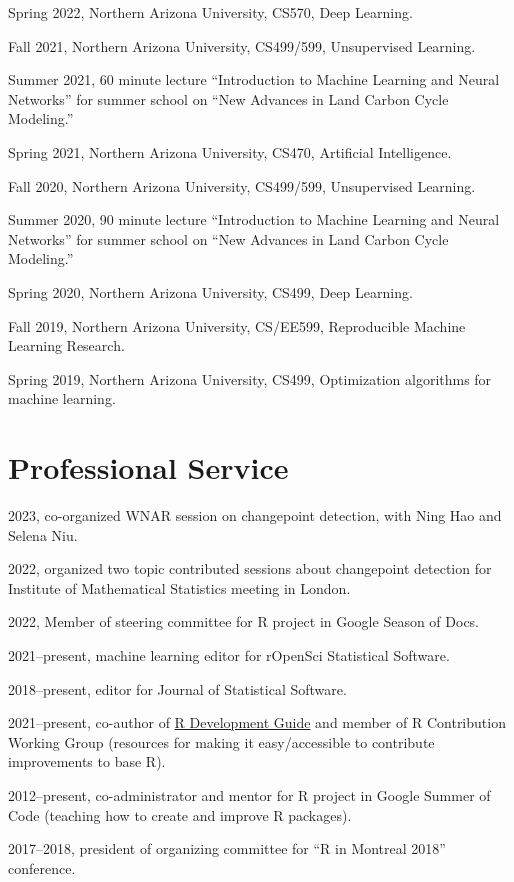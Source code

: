 \documentclass[margin,line]{res}
\begin{document}
\begin{resume}
Spring 2022, Northern Arizona University, CS570, Deep Learning.

Fall 2021, Northern Arizona University, CS499/599, Unsupervised Learning.

Summer 2021, 60 minute lecture ``Introduction to Machine Learning and
Neural Networks'' for summer school on ``New Advances in Land Carbon
Cycle Modeling.''

Spring 2021, Northern Arizona University, CS470, Artificial Intelligence.

Fall 2020, Northern Arizona University, CS499/599, Unsupervised
Learning.

Summer 2020, 90 minute lecture ``Introduction to Machine Learning and
Neural Networks'' for summer school on ``New Advances in Land Carbon
Cycle Modeling.''

Spring 2020, Northern Arizona University, CS499, Deep Learning.

Fall 2019, Northern Arizona University, CS/EE599, Reproducible Machine
Learning Research.

Spring 2019, Northern Arizona University, CS499, Optimization
algorithms for machine learning.

\section{\sc Professional Service}

2023, co-organized WNAR session on changepoint detection, with Ning
Hao and Selena Niu.

2022, organized two topic contributed sessions about changepoint
detection for Institute of Mathematical Statistics meeting in London.

2022, Member of steering committee for R project in Google Season of Docs.

2021--present, machine learning editor for rOpenSci Statistical Software.

2018--present, editor for Journal of Statistical Software.

2021--present, co-author of
\href{https://contributor.r-project.org/rdevguide/}{R Development
  Guide} and member of R Contribution Working Group (resources for
making it easy/accessible to contribute improvements to base R).

2012--present, co-administrator and mentor for R project in Google
Summer of Code (teaching how to create and improve R packages).

2017--2018, president of organizing committee for ``R in Montreal
2018'' conference.


\end{resume}
\end{document}

